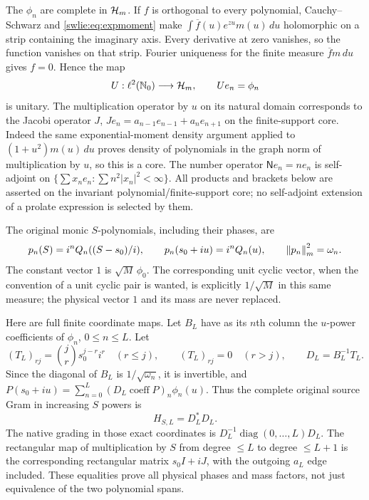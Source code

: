 \documentclass[11pt]{article}
\begin{document}
The $\phi_n$ are complete in $\mathcal H_m$. If $f$ is orthogonal
to every polynomial, Cauchy--Schwarz and \eqref{swlie:eq:expmoment}
make $\int\overline f(u)e^{zu}m(u)\,du$ holomorphic on a
strip containing the imaginary axis. Every derivative at
zero vanishes, so the function vanishes on that strip.
Fourier uniqueness for the finite measure $\overline f m\,du$
gives $f=0$. Hence the map
\[
 U:\ell^2(\mathbb N_0)\longrightarrow\mathcal H_m,\qquad Ue_n=\phi_n
\]
is unitary. The multiplication operator by $u$ on its natural
domain corresponds to the Jacobi operator $J$,
$Je_n=a_{n-1}e_{n-1}+a_ne_{n+1}$ on the finite-support core.
Indeed the same exponential-moment density argument applied
to $(1+u^2)m(u)\,du$ proves density of polynomials in the
graph norm of multiplication by $u$, so this is a core.
The number operator $\mathsf N e_n=ne_n$ is self-adjoint
on $\{\sum x_ne_n:\sum n^2|x_n|^2<\infty\}$.
All products and brackets below are asserted on the
invariant polynomial/finite-support core; no self-adjoint
extension of a prolate expression is selected by them.

The original monic $S$-polynomials, including their phases, are
\begin{equation}\label{swlie:eq:physical-polys}
 p_n(S)=i^nQ_n((S-s_0)/i),\qquad
 p_n(s_0+iu)=i^nQ_n(u),\qquad \left\lVert p_n\right\rVert_m^2=\omega_n.
\end{equation}
The constant vector $1$ is $\sqrt M\,\phi_0$.
The corresponding unit cyclic vector, when the convention of
a unit cyclic pair is wanted, is explicitly $1/\sqrt M$
in this same measure; the physical vector $1$ and its mass
are never replaced.

Here are full finite coordinate maps. Let $B_L$ have as its
$n$th column the $u$-power coefficients of $\phi_n$, $0\leq n\leq L$.
Let
\begin{equation}\label{swlie:eq:coordinates}
 (T_L)_{rj}=\binom jr s_0^{j-r}i^r\quad(r\leq j),\qquad
 (T_L)_{rj}=0\quad(r>j),\qquad
 D_L=B_L^{-1}T_L.
\end{equation}
Since the diagonal of $B_L$ is $1/\sqrt{\omega_n}$,
it is invertible, and
$P(s_0+iu)=\sum_{n=0}^L(D_L\operatorname{coeff}P)_n\phi_n(u)$.
Thus the complete original source Gram in increasing $S$ powers is
\begin{equation}\label{swlie:eq:sourcegram}
 H_{S,L}=D_L^*D_L.
\end{equation}
The native grading in those exact coordinates is
$D_L^{-1}\operatorname{diag}(0,\ldots,L)D_L$.
The rectangular map of multiplication by $S$ from degree
$\leq L$ to degree $\leq L+1$ is the corresponding rectangular
matrix $s_0I+iJ$, with the outgoing $a_L$ edge included.
These equalities prove all physical phases and mass factors,
not just equivalence of the two polynomial spans.
\end{document}
